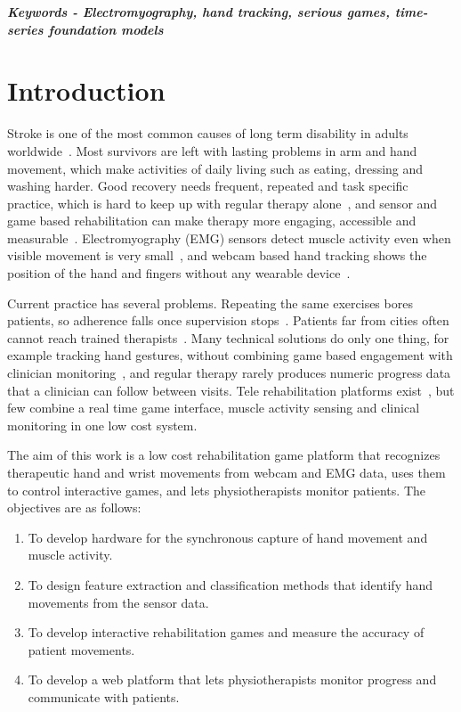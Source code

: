 \documentclass[10pt,a4paper,twocolumn]{article}
\begin{document}
\vspace{10pt}
\noindent\textbf{\textit{Keywords - Electromyography, hand tracking, serious games, time-series foundation models}}

\section{Introduction}

Stroke is one of the most common causes of long term disability in adults worldwide~\cite{gbd2024}. Most survivors are left with lasting problems in arm and hand movement, which make activities of daily living such as eating, dressing and washing harder. Good recovery needs frequent, repeated and task specific practice, which is hard to keep up with regular therapy alone~\cite{winstein2018}, and sensor and game based rehabilitation can make therapy more engaging, accessible and measurable~\cite{doumas2021}. Electromyography (EMG) sensors detect muscle activity even when visible movement is very small~\cite{munoz2022}, and webcam based hand tracking shows the position of the hand and fingers without any wearable device~\cite{zhang2020}.

Current practice has several problems. Repeating the same exercises bores patients, so adherence falls once supervision stops~\cite{winstein2018}. Patients far from cities often cannot reach trained therapists~\cite{lee2018}. Many technical solutions do only one thing, for example tracking hand gestures, without combining game based engagement with clinician monitoring~\cite{zondervan2016,song2019}, and regular therapy rarely produces numeric progress data that a clinician can follow between visits. Tele rehabilitation platforms exist~\cite{lee2018,marin2021}, but few combine a real time game interface, muscle activity sensing and clinical monitoring in one low cost system.

The aim of this work is a low cost rehabilitation game platform that recognizes therapeutic hand and wrist movements from webcam and EMG data, uses them to control interactive games, and lets physiotherapists monitor patients. The objectives are as follows:
\begin{enumerate}
\item To develop hardware for the synchronous capture of hand movement and muscle activity.
\item To design feature extraction and classification methods that identify hand movements from the sensor data.
\item To develop interactive rehabilitation games and measure the accuracy of patient movements.
\item To develop a web platform that lets physiotherapists monitor progress and communicate with patients.
\end{enumerate}
\end{document}
